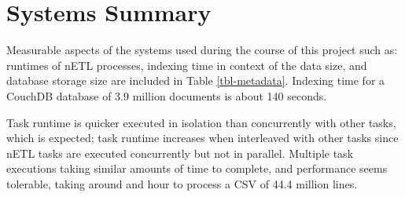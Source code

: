 \section{Systems Summary}
Measurable aspects of the systems used during the course of this project such as: runtimes of nETL processes, indexing time in context of the data size, and database storage size are included in Table \ref{tbl-metadata}. Indexing time for a CouchDB database of 3.9 million documents is about 140 seconds.

Task runtime is quicker executed in isolation than concurrently with other tasks, which is expected; task runtime increases when interleaved with other tasks since nETL tasks are executed concurrently but not in parallel. Multiple task executions taking similar amounts of time to complete, and performance seems tolerable, taking around and hour to process a CSV of 44.4 million lines.

